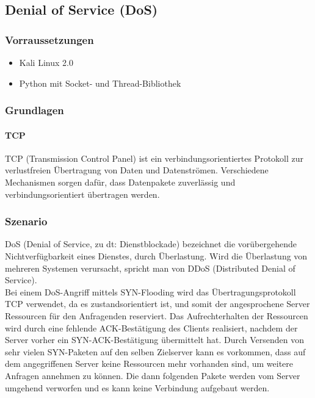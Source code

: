 \subsection{Denial of Service (DoS)}

\subsubsection*{Vorraussetzungen}

\begin{itemize}
\item Kali Linux 2.0
\item Python mit Socket- und Thread-Bibliothek
\end{itemize}


\subsubsection*{Grundlagen}

\paragraph*{TCP}
TCP (Transmission Control Panel) ist ein verbindungsorientiertes Protokoll zur verlustfreien Übertragung von Daten und Datenströmen. Verschiedene Mechanismen sorgen dafür, dass Datenpakete zuverlässig und verbindungsorientiert übertragen werden.

\subsubsection*{Szenario}

DoS (Denial of Service, zu dt: Dienstblockade) bezeichnet die vorübergehende Nichtverfügbarkeit eines Dienstes, durch Überlastung. Wird die Überlastung von mehreren Systemen verursacht,
spricht man von DDoS (Distributed Denial of Service). \\
Bei einem DoS-Angriff mittels SYN-Flooding wird das Übertragungsprotokoll TCP verwendet, da es zustandsorientiert ist, und somit der angesprochene Server Ressourcen für den Anfragenden reserviert.
 Das Aufrechterhalten der Ressourcen wird durch eine fehlende ACK-Bestätigung des Clients realisiert, nachdem der Server vorher ein SYN-ACK-Bestätigung übermittelt hat. Durch Versenden von sehr vielen SYN-Paketen auf den selben Zielserver kann es vorkommen, dass auf dem angegriffenen Server keine Ressourcen mehr vorhanden sind, um weitere Anfragen annehmen zu können. Die dann folgenden Pakete werden vom Server umgehend verworfen und es kann keine Verbindung aufgebaut werden. \cite{dnssec}

